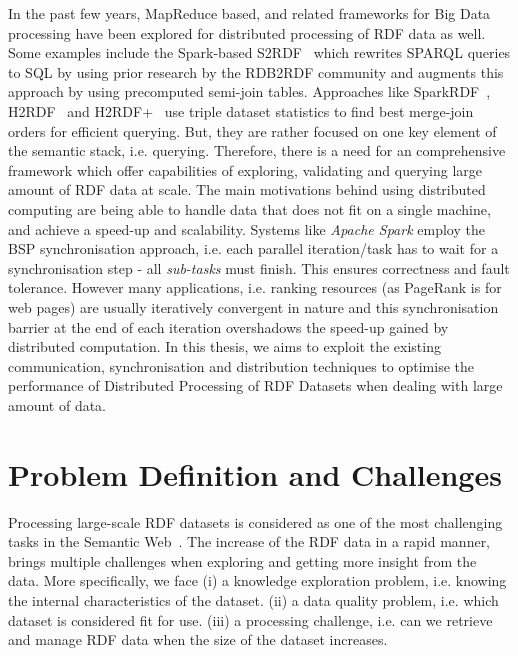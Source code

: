 In the past few years, MapReduce based, and related frameworks for Big Data processing have been explored for distributed processing of \gls{RDF} data as well. 
Some examples include the Spark-based S2RDF~\cite{Schatzle:2016:SRQ:2977797.2977806} which rewrites \gls{SPARQL} queries to SQL by using prior research by the RDB2RDF community and augments this approach by using precomputed semi-join tables. Approaches like SparkRDF~\cite{xu2015sparkrdf}, H2RDF~\cite{papailiou2013h} and H2RDF+~\cite{papailiou2012h2rdf} use triple dataset statistics to find best merge-join orders for efficient querying.
But, they are rather focused on one key element of the semantic stack, i.e. querying.
Therefore, there is a need for an comprehensive framework which offer capabilities of exploring, validating and querying large amount of \gls{RDF} data at scale.
The main motivations behind using distributed computing are being able to handle data that does not fit on a single machine, and achieve a speed-up and scalability.
Systems like \textit{Apache Spark} employ the \gls{BSP} synchronisation approach, i.e. each parallel iteration/task has to wait for a synchronisation step - all \textit{sub-tasks} must finish. 
This ensures correctness and fault tolerance.
However many applications, i.e. ranking resources (as PageRank is for web pages) are usually iteratively convergent in nature and this synchronisation barrier at the end of each iteration overshadows the speed-up gained by distributed computation. 
In this thesis, we aims to exploit the existing communication, synchronisation and distribution techniques to optimise the performance of Distributed Processing of \gls{RDF} Datasets when dealing with large amount of data.

\section{Problem Definition and Challenges}
\label{sec:problem-definition-and-challenges}
Processing large-scale \gls{RDF} datasets is considered as one of the most challenging tasks in the Semantic Web~\cite{Benjamins02sixchallenges}.
The increase of the \gls{RDF} data in a rapid manner, brings multiple challenges when exploring and getting more insight from the data.
More specifically, we face (i) a knowledge exploration problem, i.e. knowing the internal characteristics of the dataset. 
(ii) a data quality problem, i.e. which dataset is considered fit for use.
(iii) a processing challenge, i.e. can we retrieve and manage \gls{RDF} data when the size of the dataset increases.

